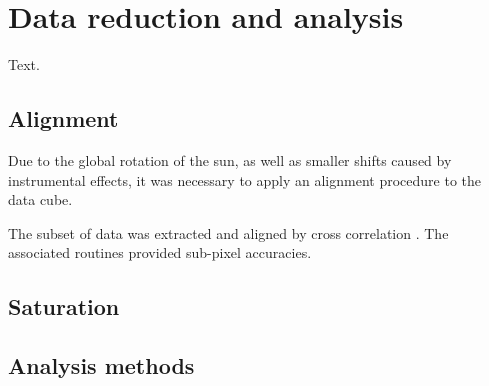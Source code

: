 

%   




%


%
%

\section{Data reduction and analysis}

Text.



\subsection{Alignment}

Due to the global rotation of the sun, as well as smaller shifts caused
by instrumental effects, it was necessary to apply an alignment procedure
to the data cube.

The subset of data was extracted and aligned by cross correlation
\citep{McAteer2003, McAteer2004}.
The associated routines provided sub-pixel accuracies.



\subsection{Saturation}





\subsection{Analysis methods}
